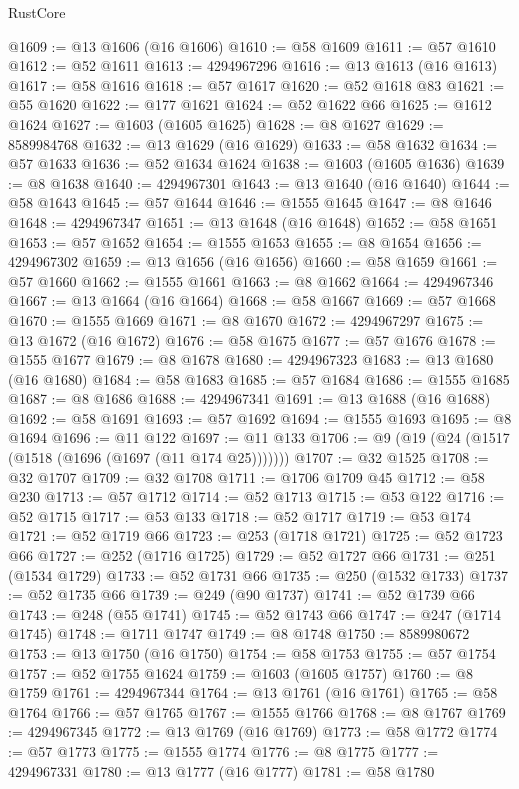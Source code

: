 \begin{lexlean}{RustCore}
\begin{coremodule}
@1609 := @13 @1606 (@16 @1606)
@1610 := @58 @1609
@1611 := @57 @1610
@1612 := @52 @1611
@1613 := 4294967296
@1616 := @13 @1613 (@16 @1613)
@1617 := @58 @1616
@1618 := @57 @1617
@1620 := @52 @1618 @83
@1621 := @55 @1620
@1622 := @177 @1621
@1624 := @52 @1622 @66
@1625 := @1612 @1624
@1627 := @1603 (@1605 @1625)
@1628 := @8 @1627
@1629 := 8589984768
@1632 := @13 @1629 (@16 @1629)
@1633 := @58 @1632
@1634 := @57 @1633
@1636 := @52 @1634 @1624
@1638 := @1603 (@1605 @1636)
@1639 := @8 @1638
@1640 := 4294967301
@1643 := @13 @1640 (@16 @1640)
@1644 := @58 @1643
@1645 := @57 @1644
@1646 := @1555 @1645
@1647 := @8 @1646
@1648 := 4294967347
@1651 := @13 @1648 (@16 @1648)
@1652 := @58 @1651
@1653 := @57 @1652
@1654 := @1555 @1653
@1655 := @8 @1654
@1656 := 4294967302
@1659 := @13 @1656 (@16 @1656)
@1660 := @58 @1659
@1661 := @57 @1660
@1662 := @1555 @1661
@1663 := @8 @1662
@1664 := 4294967346
@1667 := @13 @1664 (@16 @1664)
@1668 := @58 @1667
@1669 := @57 @1668
@1670 := @1555 @1669
@1671 := @8 @1670
@1672 := 4294967297
@1675 := @13 @1672 (@16 @1672)
@1676 := @58 @1675
@1677 := @57 @1676
@1678 := @1555 @1677
@1679 := @8 @1678
@1680 := 4294967323
@1683 := @13 @1680 (@16 @1680)
@1684 := @58 @1683
@1685 := @57 @1684
@1686 := @1555 @1685
@1687 := @8 @1686
@1688 := 4294967341
@1691 := @13 @1688 (@16 @1688)
@1692 := @58 @1691
@1693 := @57 @1692
@1694 := @1555 @1693
@1695 := @8 @1694
@1696 := @11 @122
@1697 := @11 @133
@1706 := @9 (@19 (@24 (@1517 (@1518 (@1696 (@1697 (@11 @174 @25)))))))
@1707 := @32 @1525
@1708 := @32 @1707
@1709 := @32 @1708
@1711 := @1706 @1709 @45
@1712 := @58 @230
@1713 := @57 @1712
@1714 := @52 @1713
@1715 := @53 @122
@1716 := @52 @1715
@1717 := @53 @133
@1718 := @52 @1717
@1719 := @53 @174
@1721 := @52 @1719 @66
@1723 := @253 (@1718 @1721)
@1725 := @52 @1723 @66
@1727 := @252 (@1716 @1725)
@1729 := @52 @1727 @66
@1731 := @251 (@1534 @1729)
@1733 := @52 @1731 @66
@1735 := @250 (@1532 @1733)
@1737 := @52 @1735 @66
@1739 := @249 (@90 @1737)
@1741 := @52 @1739 @66
@1743 := @248 (@55 @1741)
@1745 := @52 @1743 @66
@1747 := @247 (@1714 @1745)
@1748 := @1711 @1747
@1749 := @8 @1748
@1750 := 8589980672
@1753 := @13 @1750 (@16 @1750)
@1754 := @58 @1753
@1755 := @57 @1754
@1757 := @52 @1755 @1624
@1759 := @1603 (@1605 @1757)
@1760 := @8 @1759
@1761 := 4294967344
@1764 := @13 @1761 (@16 @1761)
@1765 := @58 @1764
@1766 := @57 @1765
@1767 := @1555 @1766
@1768 := @8 @1767
@1769 := 4294967345
@1772 := @13 @1769 (@16 @1769)
@1773 := @58 @1772
@1774 := @57 @1773
@1775 := @1555 @1774
@1776 := @8 @1775
@1777 := 4294967331
@1780 := @13 @1777 (@16 @1777)
@1781 := @58 @1780

\end{coremodule}
\end{lexlean}
